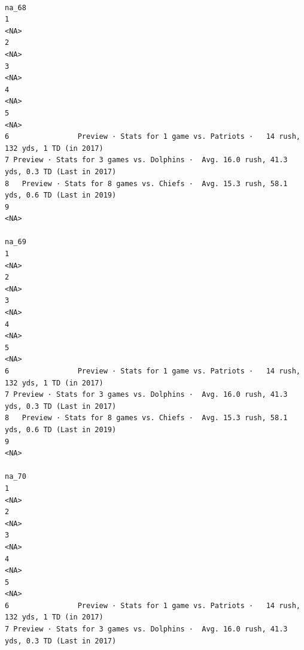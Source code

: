 \documentclass[
]{article}
\begin{document}
\begin{verbatim}
                                                                                        na_68
1                                                                                        <NA>
2                                                                                        <NA>
3                                                                                        <NA>
4                                                                                        <NA>
5                                                                                        <NA>
6                Preview · Stats for 1 game vs. Patriots ·   14 rush, 132 yds, 1 TD (in 2017)
7 Preview · Stats for 3 games vs. Dolphins ·  Avg. 16.0 rush, 41.3 yds, 0.3 TD (Last in 2017)
8   Preview · Stats for 8 games vs. Chiefs ·  Avg. 15.3 rush, 58.1 yds, 0.6 TD (Last in 2019)
9                                                                                        <NA>
                                                                                        na_69
1                                                                                        <NA>
2                                                                                        <NA>
3                                                                                        <NA>
4                                                                                        <NA>
5                                                                                        <NA>
6                Preview · Stats for 1 game vs. Patriots ·   14 rush, 132 yds, 1 TD (in 2017)
7 Preview · Stats for 3 games vs. Dolphins ·  Avg. 16.0 rush, 41.3 yds, 0.3 TD (Last in 2017)
8   Preview · Stats for 8 games vs. Chiefs ·  Avg. 15.3 rush, 58.1 yds, 0.6 TD (Last in 2019)
9                                                                                        <NA>
                                                                                        na_70
1                                                                                        <NA>
2                                                                                        <NA>
3                                                                                        <NA>
4                                                                                        <NA>
5                                                                                        <NA>
6                Preview · Stats for 1 game vs. Patriots ·   14 rush, 132 yds, 1 TD (in 2017)
7 Preview · Stats for 3 games vs. Dolphins ·  Avg. 16.0 rush, 41.3 yds, 0.3 TD (Last in 2017)

\end{verbatim}
\end{document}
